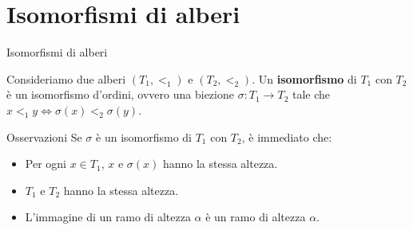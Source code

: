 \documentclass{beamer}
\theoremstyle{num.custom-title}
\theoremstyle{custom-title}
\renewcommand{\iff}{\Leftrightarrow}
\renewcommand{\emph}[1]{\textbf{#1}}
\begin{document}
\section{Isomorfismi di alberi}

\begin{frame}{Isomorfismi di alberi}

\begin{definition}
Consideriamo due alberi $(T_1,<_1)$ e $(T_2,<_2)$. Un \emph{isomorfismo} di $T_1$ con $T_2$ è un isomorfismo d'ordini, ovvero una biezione $\sigma \colon T_1 \to T_2$ tale che $x <_1 y \iff \sigma(x) <_2 \sigma(y)$.
\end{definition}

\pause

\begin{block}{Osservazioni}
Se $\sigma$ è un isomorfismo di $T_1$ con $T_2$, è immediato che:
\begin{itemize}
\item Per ogni $x \in T_1$, $x$ e $\sigma(x)$ hanno la stessa altezza.
\item $T_1$ e $T_2$ hanno la stessa altezza.
\item L'immagine di un ramo di altezza $\alpha$ è un ramo di altezza $\alpha$.
\end{itemize}
\end{block}

\end{frame}
\end{document}
